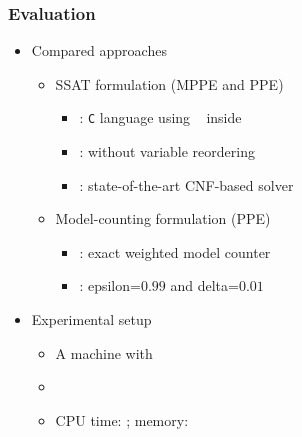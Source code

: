 \newcommand{\ncircuit}{\num{30}}

\begin{frame}
    \frametitle{Evaluation}
    \begin{itemize}
        \item Compared approaches
              \pause
              \begin{itemize}
                  \item SSAT formulation (MPPE and PPE)
                        \begin{itemize}
                            \item \bddsp: \texttt{C} language using \cudd~\cite{CUDD} inside \abc~\cite{ABC}
                            \item \bddspnr: \bddsp without variable reordering
                            \item \dcssat: state-of-the-art CNF-based solver
                        \end{itemize}
                        \pause
                  \item Model-counting formulation (PPE)
                        \begin{itemize}
                            \item \cachet: exact weighted model counter
                            \item \approxmc: epsilon=$0.99$ and delta=$0.01$
                        \end{itemize}
                        \pause
              \end{itemize}
        \item Experimental setup
              \pause
              \begin{itemize}
                  \item A machine with~\machineSpec
                  \item \osInfo
                  \item CPU time: \timelimit; memory: \memlimit
              \end{itemize}
    \end{itemize}
\end{frame}

